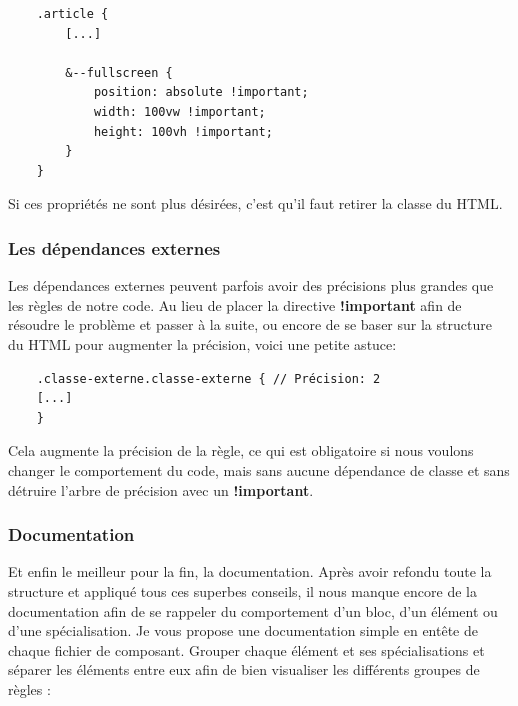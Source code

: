 \documentclass[12pt, a4paper]{report}
\begin{document}
\begin{lstlisting}
    .article {
        [...]

        &--fullscreen {
            position: absolute !important;
            width: 100vw !important;
            height: 100vh !important;
        }
    }
\end{lstlisting}

Si ces propriétés ne sont plus désirées, c'est qu'il faut retirer la classe du HTML.

\subsubsection{Les dépendances externes}

Les dépendances externes peuvent parfois avoir des précisions plus grandes que les règles de notre code.
Au lieu de placer la directive \textbf{!important} afin de résoudre le problème et passer à la suite, ou encore de se baser sur la structure du HTML pour augmenter la précision, voici une petite astuce:

\begin{lstlisting}
    .classe-externe.classe-externe { // Précision: 2
    [...]
    }
\end{lstlisting}

Cela augmente la précision de la règle, ce qui est obligatoire si nous voulons changer le comportement du code, mais sans aucune dépendance de classe et sans détruire l'arbre de précision avec un \textbf{!important}.

\subsubsection{Documentation}

Et enfin le meilleur pour la fin, la documentation.
Après avoir refondu toute la structure et appliqué tous ces superbes conseils, il nous manque encore de la documentation afin de se rappeler du comportement d'un bloc, d'un élément ou d'une spécialisation.
Je vous propose une documentation simple en entête de chaque fichier de composant.
Grouper chaque élément et ses spécialisations et séparer les éléments entre eux afin de bien visualiser les différents groupes de règles :
\end{document}
